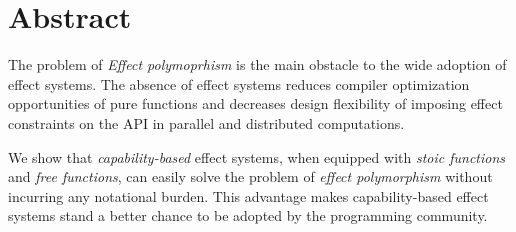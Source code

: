 \section*{\centering Abstract}

The problem of \emph{Effect polymoprhism} is the main obstacle to the
wide adoption of effect systems. The absence of effect systems reduces
compiler optimization opportunities of pure functions and decreases
design flexibility of imposing effect constraints on the API in
parallel and distributed computations.


We show that \emph{capability-based} effect systems, when equipped
with \emph{stoic functions} and \emph{free functions}, can easily
solve the problem of \emph{effect polymorphism} without incurring any
notational burden. This advantage makes capability-based effect
systems stand a better chance to be adopted by the programming
community.
